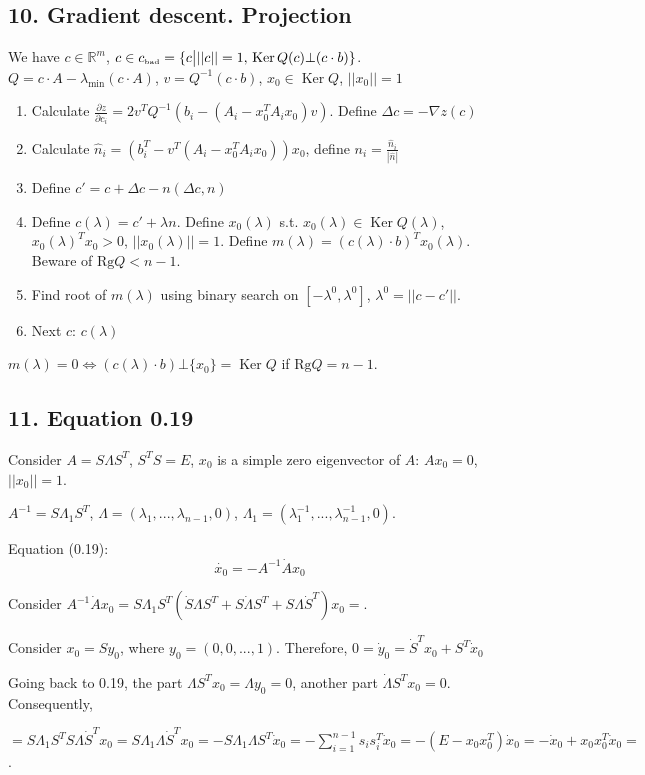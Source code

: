 \documentclass[a4paper]{article}
\DeclareMathOperator{\Ker}{Ker}
\begin{document}
\subsection*{10. Gradient descent. Projection}
We have $c\in\mathbb{R}^m$, $c\in c_{\mbox{\tiny bad}}=\{c\big| ||c||=1,\,\Ker Q(c)\bot (c\cdot b)\}$. $Q=c\cdot A-\lambda_{\min}(c\cdot A)$, $v=Q^{-1}(c\cdot b)$, $x_0\in\Ker Q$, $||x_0||=1$
\begin{enumerate}
\item Calculate $\frac{\partial z}{\partial c_i}=2v^TQ^{-1}(b_i-(A_i-x_0^TA_ix_0)v)$. Define $\Delta c=-\nabla z(c)$
\item Calculate $\hat{n}_i=\left(b_i^T-v^T(A_i-x_0^TA_ix_0)\right)x_0$, define $n_i=\frac{\hat{n}_i}{|\hat{n}|}$
\item Define $c'=c+\Delta c-n(\Delta c, n)$
\item Define $c(\lambda)=c'+\lambda n$. Define $x_0(\lambda)$ s.t. $x_0(\lambda)\in \Ker Q(\lambda)$, $x_0(\lambda)^Tx_0>0$, $||x_0(\lambda)||=1$. Define $m(\lambda)=(c(\lambda)\cdot b)^Tx_0(\lambda)$. Beware of $\mbox{Rg}Q<n-1$.
\item Find root of $m(\lambda)$ using binary search on $[-\lambda^0,\lambda^0]$, $\lambda^0=||c-c'||$.
\item Next $c$: $c(\lambda)$
\end{enumerate}

$m(\lambda)=0\Leftrightarrow (c(\lambda)\cdot b)\bot\{x_0\}=\Ker Q$ if $\mbox{Rg}Q=n-1$.
\subsection*{11. Equation 0.19}
Consider $A=S\Lambda S^T$, $S^TS=E$, $x_0$ is a simple zero eigenvector of $A$: $Ax_0=0$, $||x_0||=1$.

$A^{-1}=S\Lambda_1S^T$, $\Lambda=(\lambda_1,...,\lambda_{n-1},0)$, $\Lambda_1=(\lambda_1^{-1},...,\lambda_{n-1}^{-1},0)$.

Equation (0.19):
$$\dot{x_0}=-A^{-1}\dot{A}x_0$$

Consider $A^{-1}\dot{A}x_0=S\Lambda_1S^T(\dot{S}\Lambda S^T+S\dot{\Lambda} S^T+S\Lambda \dot{S}^T)x_0\boxed{=}$.

Consider $x_0=Sy_0$, where $y_0=(0,0,...,1)$. Therefore, $0=\dot{y}_0=\dot{S}^Tx_0+S^T\dot{x}_0$

Going back to 0.19, the part $\Lambda S^Tx_0=\Lambda y_0=0$, another part $\dot{\Lambda}S^Tx_0=0$. Consequently,

$\boxed{=}S\Lambda_1S^TS\Lambda \dot{S}^Tx_0=S\Lambda_1\Lambda\dot{S}^Tx_0=-S\Lambda_1\Lambda S^T\dot{x}_0=-\sum\limits_{i=1}^{n-1}s_is_i^T\dot{x}_0=-(E-x_0x_0^T)\dot{x}_0=-\dot{x}_0+x_0x_0^T\dot{x}_0\boxed{=}$.
\end{document}
